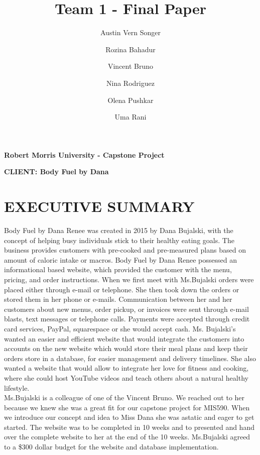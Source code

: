 \documentclass[letterpaper,11pt,2p]{elsarticle}
\begin{document}
\begin{frontmatter}
\title{Team 1 - Final Paper}
\author[]{Austin Vern Songer}
\author[]{Rozina Bahadur}
\author[]{Vincent Bruno}
\author[]{Nina Rodriguez}
\author[]{Olena Pushkar}
\author[]{Uma Rani}
\end{frontmatter}
\begin{center}
\textbf{ Robert Morris University - Capstone Project}
\end{center}
\begin{center}
\textbf{CLIENT: Body Fuel by Dana}
\end{center}


\newpage

\tableofcontents

\clearpage

\section{ EXECUTIVE SUMMARY}%
\label{ES}%

Body Fuel by Dana Renee was created in 2015 by Dana Bujalski, with the concept of helping busy individuals stick to their healthy eating goals. The business provides customers with pre-cooked and pre-measured plans based on amount of caloric intake or macros. Body Fuel by Dana Renee possessed an informational based website, which provided the customer with the menu, pricing, and order instructions. When we first meet with Ms.Bujalski orders were placed either through e-mail or telephone. She then took down the orders or stored them in her phone or e-mails.  Communication between her and her customers about new menus, order pickup, or invoices were sent through e-mail blasts, text messages or telephone calls. Payments were accepted through credit card services, PayPal, squarespace or she would accept cash.  Ms. Bujalski’s wanted an easier and efficient website that would integrate the customers into accounts on the new website which would store their meal plans and keep their orders store in a database, for easier management and delivery timelines. She also wanted a website that would allow to integrate her love for fitness and cooking, where she could host YouTube videos and teach others about a natural healthy lifestyle.\\


Ms.Bujalski is a colleague of one of the Vincent Bruno. We reached out to her because we knew she was a great fit for our capstone project for MIS590. When we introduce our concept and idea to Miss Dana she was astatic and eager to get started. The website was to be completed in 10 weeks and to presented and hand over the complete website to her at the end  of the 10 weeks.  Ms.Bujalski agreed to a \$300 dollar budget for the website and database implementation.\\
\end{document}
